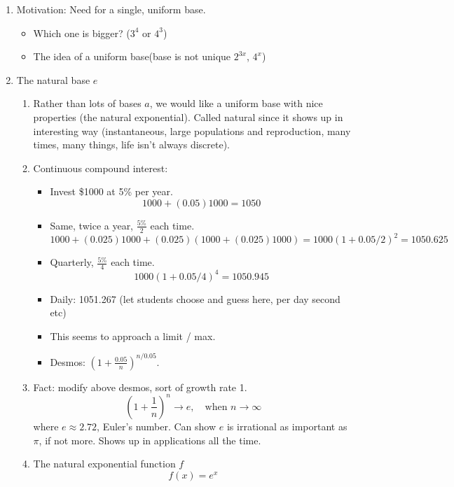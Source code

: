 \documentclass{article}
\begin{document}
\begin{enumerate}

\item Motivation: Need for a single, uniform base.
\begin{itemize}
\item Which one is bigger? ($3^4$ or $4^3$)
\item The idea of a uniform base(base is not unique $2^{3x}$, $4^x$)
\end{itemize}

\item The natural base $e$
\begin{enumerate}
\item Rather than lots of bases $a$, we would like a uniform base with nice properties (the natural exponential). Called natural since it shows up in interesting way (instantaneous, large populations and reproduction, many times, many things, life isn't always discrete).
\item Continuous compound interest:
\begin{itemize}
\item Invest \$1000 at 5\% per year.
$$
1000 + (0.05)1000 = 1050
$$
\item Same, twice a year, $\frac{5\%}{2}$ each time.
$$
1000 + (0.025)1000 + (0.025)(1000 + (0.025)1000)  = 
1000(1+0.05/2)^2 = 1050.625
$$
\item Quarterly, $\frac{5\%}{4}$ each time.
$$
1000(1+0.05/4)^4 = 1050.945
$$
\item Daily: 1051.267 (let students choose and guess here, per day second etc)
\item This seems to approach a limit / max.
\item Desmos: $(1+\frac{0.05}{n})^{n/0.05}$. 
\end{itemize}
\item Fact: modify above desmos, sort of growth rate 1.
$$
(1+\frac{1}{n})^n \rightarrow e,\quad\text{when } n\rightarrow \infty  
$$
where $e\approx 2.72$, Euler's number. Can show $e$ is irrational as important as $\pi$, if not more. Shows up in applications all the time. 
\item The natural exponential function $f$
$$
f(x) = e^x
$$
\end{enumerate}


\end{enumerate}
\end{document}
